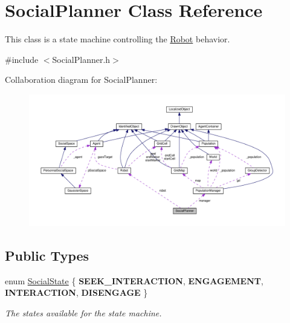 \hypertarget{classSocialPlanner}{}\section{Social\+Planner Class Reference}
\label{classSocialPlanner}


This class is a state machine controlling the \hyperlink{classRobot}{Robot} behavior.  




{\ttfamily \#include $<$Social\+Planner.\+h$>$}



Collaboration diagram for Social\+Planner\+:\nopagebreak
\begin{figure}[H]
\begin{center}
\leavevmode
\includegraphics[width=350pt]{classSocialPlanner__coll__graph}
\end{center}
\end{figure}
\subsection*{Public Types}
\begin{DoxyCompactItemize}
\item 
enum \hyperlink{classSocialPlanner_acb2c5c7ab803cafef828f504b1df5f6d}{Social\+State} \{ {\bfseries S\+E\+E\+K\+\_\+\+I\+N\+T\+E\+R\+A\+C\+T\+I\+ON}, 
{\bfseries E\+N\+G\+A\+G\+E\+M\+E\+NT}, 
{\bfseries I\+N\+T\+E\+R\+A\+C\+T\+I\+ON}, 
{\bfseries D\+I\+S\+E\+N\+G\+A\+GE}
 \}\hypertarget{classSocialPlanner_acb2c5c7ab803cafef828f504b1df5f6d}{}\label{classSocialPlanner_acb2c5c7ab803cafef828f504b1df5f6d}
\begin{DoxyCompactList}\small\item\em The states available for the state machine. \end{DoxyCompactList}
\end{DoxyCompactItemize}
